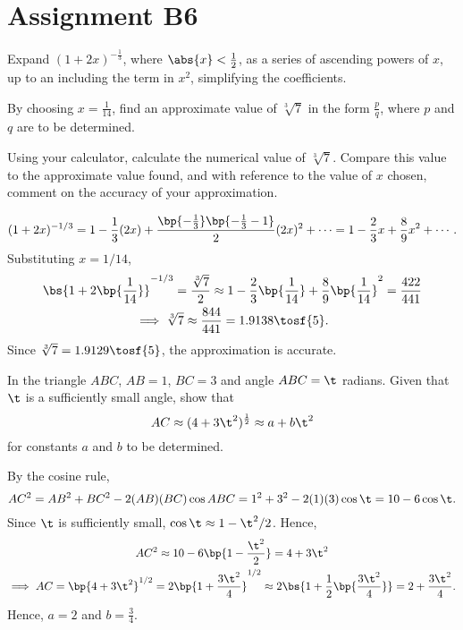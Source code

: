 \section{Assignment B6}

\begin{problem}
    Expand $(1 + 2x)^{-\frac13}$, where $\abs{x} < \frac12$, as a series of ascending powers of $x$, up to an including the term in $x^2$, simplifying the coefficients.

    By choosing $x = \frac1{14}$, find an approximate value of $\sqrt[3]{7}$ in the form $\frac{p}{q}$, where $p$ and $q$ are to be determined.

    Using your calculator, calculate the numerical value of $\sqrt[3]{7}$. Compare this value to the approximate value found, and with reference to the value of $x$ chosen, comment on the accuracy of your approximation.
\end{problem}
\begin{solution}
    \[(1 + 2x)^{-1/3} = 1 -\frac13 (2x) + \frac{\bp{-\frac13}\bp{-\frac13 - 1}}2 (2x)^2 + \cdots = 1 - \frac23 x + \frac89 x^2 + \cdots.\] Substituting $x = 1/14$,
    \begin{gather*}
        \bs{1 + 2\bp{\frac1{14}}}^{-1/3} = \frac{\sqrt[3]{7}}{2} \approx 1 - \frac23 \bp{\frac1{14}} + \frac89 \bp{\frac1{14}}^2 = \frac{422}{441}\\
        \implies \sqrt[3]{7} \approx \frac{844}{441} = 1.9138 \tosf{5}.
    \end{gather*}
    Since $\sqrt[3]7 = 1.9129 \tosf{5}$, the approximation is accurate.
\end{solution}

\begin{problem}
    In the triangle $ABC$, $AB = 1$, $BC = 3$ and angle $ABC = \t$ radians. Given that $\t$ is a sufficiently small angle, show that \[AC \approx (4 + 3\t^2)^{\frac12} \approx a + b\t^2\] for constants $a$ and $b$ to be determined.
\end{problem}
\begin{solution}
    By the cosine rule, \[AC^2 = AB^2 + BC^2 - 2(AB)(BC)\cos ABC = 1^2 + 3^2 - 2(1)(3) \cos \t = 10 - 6 \cos \t.\] Since $\t$ is sufficiently small, $\cos \t \approx 1 - \t^2/2$. Hence,
    \begin{gather*}
        AC^2 \approx 10 - 6\bp{1 - \frac{\t^2}{2}} = 4 + 3\t^2 \\
        \implies AC = \bp{4 + 3\t^2}^{1/2} = 2\bp{1 + \frac{3\t^2}4}^{1/2} \approx 2\bs{1 + \frac12 \bp{\frac{3\t^2}4}} = 2 + \frac{3\t^2}4.
    \end{gather*}
    Hence, $a = 2$ and $b = \frac34$.
\end{solution}

